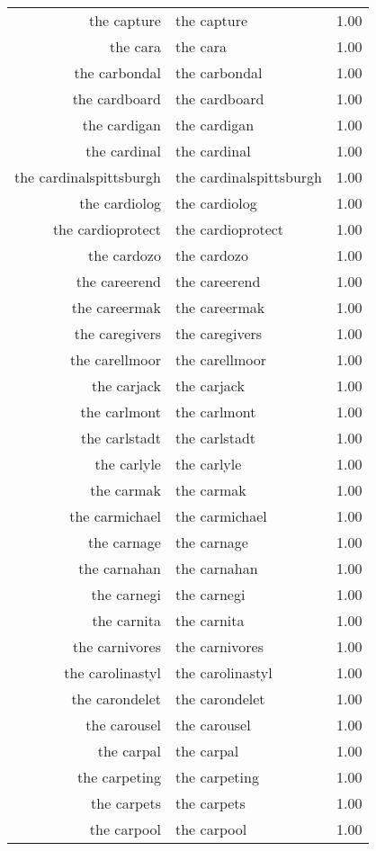 \begin{table}[ht]
\begin{tabular}{rlr}
  the capture & the capture & 1.00 \\ 
  the cara & the cara & 1.00 \\ 
  the carbondal & the carbondal & 1.00 \\ 
  the cardboard & the cardboard & 1.00 \\ 
  the cardigan & the cardigan & 1.00 \\ 
  the cardinal & the cardinal & 1.00 \\ 
  the cardinalspittsburgh & the cardinalspittsburgh & 1.00 \\ 
  the cardiolog & the cardiolog & 1.00 \\ 
  the cardioprotect & the cardioprotect & 1.00 \\ 
  the cardozo & the cardozo & 1.00 \\ 
  the careerend & the careerend & 1.00 \\ 
  the careermak & the careermak & 1.00 \\ 
  the caregivers & the caregivers & 1.00 \\ 
  the carellmoor & the carellmoor & 1.00 \\ 
  the carjack & the carjack & 1.00 \\ 
  the carlmont & the carlmont & 1.00 \\ 
  the carlstadt & the carlstadt & 1.00 \\ 
  the carlyle & the carlyle & 1.00 \\ 
  the carmak & the carmak & 1.00 \\ 
  the carmichael & the carmichael & 1.00 \\ 
  the carnage & the carnage & 1.00 \\ 
  the carnahan & the carnahan & 1.00 \\ 
  the carnegi & the carnegi & 1.00 \\ 
  the carnita & the carnita & 1.00 \\ 
  the carnivores & the carnivores & 1.00 \\ 
  the carolinastyl & the carolinastyl & 1.00 \\ 
  the carondelet & the carondelet & 1.00 \\ 
  the carousel & the carousel & 1.00 \\ 
  the carpal & the carpal & 1.00 \\ 
  the carpeting & the carpeting & 1.00 \\ 
  the carpets & the carpets & 1.00 \\ 
  the carpool & the carpool & 1.00 \\ 

\end{tabular}
\end{table}
